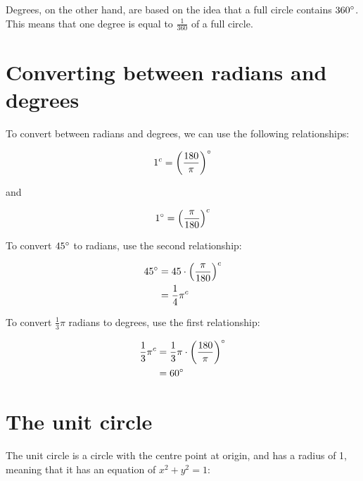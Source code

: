 \documentclass{book}
\newcommand{\rad}{^{c}}
\begin{document}
Degrees, on the other hand, are based on the idea that a full circle contains $360\degree$. This means that one degree is equal to $\frac{1}{360}$ of a full circle.



\section{Converting between radians and degrees}
To convert between radians and degrees, we can use the following relationships:

\[
	1\rad = \left({\frac{180}{\pi}}\right)\degree
\]

and

\[
	1\degree = \left(\frac{\pi}{180}\right)\rad
\]

To convert $45\degree$ to radians, use the second relationship:

\begin{align*}
	45\degree & = 45 \cdot \left(\frac{\pi}{180}\right)\rad \\
	          & = \frac{1}{4}\pi\rad
\end{align*}

To convert $\frac{1}{3}\pi$ radians to degrees, use the first relationship:

\begin{align*}
	\frac{1}{3}\pi\rad & = \frac{1}{3}\pi \cdot \left(\frac{180}{\pi}\right)\degree \\
	                   & = 60\degree
\end{align*}



\section{The unit circle}
The unit circle is a circle with the centre point at origin, and has a radius of 1, meaning that it has an equation of $x^2 + y^2 = 1$:

\begin{center}
\end{center}
\end{document}
